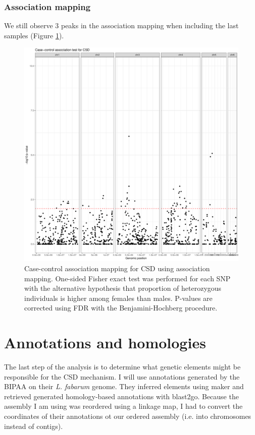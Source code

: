 \documentclass[10pt,a4paper]{report}
\begin{document}
\subsection{Association mapping}
We still observe 3 peaks in the association mapping when including the last samples (Figure \ref{C_assoc}).
\begin{figure}[h!]
\begin{center}
\includegraphics[width=\textwidth]{final_samples/case_control_BH_chromprop.pdf}
\caption{Case-control association mapping for CSD using association mapping. One-sided Fisher exact test was performed for each SNP with the alternative hypothesis that proportion of heterozygous individuals is higher among females than males. P-values are corrected using FDR with the Benjamini-Hochberg procedure.}
\label{C_assoc}
\end{center}
\end{figure}
\FloatBarrier

\chapter{Annotations and homologies}
The last step of the analysis is to determine what genetic elements might be responsible for the CSD mechanism. I will use annotations generated by the BIPAA on their \textit{L. fabarum} genome. They inferred elements using maker and retrieved generated homology-based annotations with blast2go. 
Because the assembly I am using was reordered using a linkage map, I had to convert the coordinates of their annotations ot our ordered assembly (i.e. into chromosomes instead of contigs). 
\end{document}
